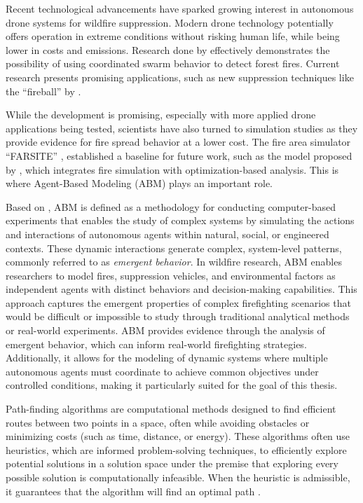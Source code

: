 \documentclass[11pt, a4paper]{article}
\begin{document}
Recent technological advancements have sparked growing interest in autonomous drone systems for wildfire suppression. Modern drone technology potentially offers operation in extreme conditions without risking human life, while being lower in costs and emissions. Research done by \citet{Yan2024} effectively demonstrates the possibility of using coordinated swarm behavior to detect forest fires. Current research presents promising applications, such as new suppression techniques like the ``fireball'' by \citet{fireBalls}.

While the development is promising, especially with more applied drone applications being tested, scientists have also turned to simulation studies as they provide evidence for fire spread behavior at a lower cost. The fire area simulator ``FARSITE'' \citep{FARSITE}, established a baseline for future work, such as the model proposed by \citet{integrated_simulation}, which integrates fire simulation with optimization-based analysis. This is where Agent-Based Modeling (ABM) plays an important role.

Based on \citet{wilensky2015introduction}, ABM is defined as a methodology for conducting computer-based experiments that enables the study of complex systems by simulating the actions and interactions of autonomous agents within natural, social, or engineered contexts. These dynamic interactions generate complex, system-level patterns, commonly referred to as \textit{emergent behavior}. In wildfire research, ABM enables researchers to model fires, suppression vehicles, and environmental factors as independent agents with distinct behaviors and decision-making capabilities. This approach captures the emergent properties of complex firefighting scenarios that would be difficult or impossible to study through traditional analytical methods or real-world experiments. ABM provides evidence through the analysis of emergent behavior, which can inform real-world firefighting strategies. Additionally, it allows for the modeling of dynamic systems where multiple autonomous agents must coordinate to achieve common objectives under controlled conditions, making it particularly suited for the goal of this thesis. 

Path-finding algorithms are computational methods designed to find efficient routes between two points in a space, often while avoiding obstacles or minimizing costs (such as time, distance, or energy). These algorithms often use heuristics, which are informed problem-solving techniques, to efficiently explore potential solutions in a solution space under the premise that exploring every possible solution is computationally infeasible. When the heuristic is admissible, it guarantees that the algorithm will find an optimal path \citep{heuristic}. 
\end{document}
